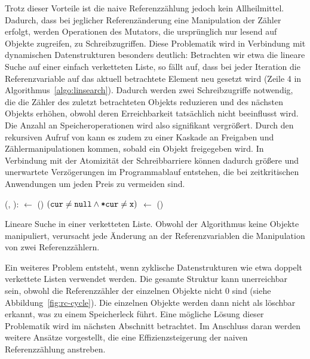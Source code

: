 Trotz dieser Vorteile ist die naive Referenzzählung jedoch kein Allheilmittel.
Dadurch, dass bei jeglicher Referenzänderung eine Manipulation der Zähler erfolgt, werden Operationen des Mutators, die ursprünglich nur lesend auf Objekte zugreifen, zu Schreibzugriffen.
Diese Problematik wird in Verbindung mit dynamischen Datenstrukturen besonders deutlich:
Betrachten wir etwa die lineare Suche auf einer einfach verketteten Liste, so fällt auf, dass bei jeder Iteration die Referenzvariable auf das aktuell betrachtete Element neu gesetzt wird (Zeile 4 in Algorithmus~\ref{algo:linsearch}).
Dadurch werden zwei Schreibzugriffe notwendig, die die Zähler des zuletzt betrachteten Objekts reduzieren und des nächsten Objekts erhöhen, obwohl deren Erreichbarkeit tatsächlich nicht beeinflusst wird.
Die Anzahl an Speicheroperationen wird also signifikant vergrößert.
Durch den rekursiven Aufruf von  kann es zudem zu einer Kaskade an Freigaben und Zählermanipulationen kommen, sobald ein Objekt freigegeben wird.
In Verbindung mit der Atomizität der Schreibbarriere können dadurch größere und unerwartete Verzögerungen im Programmablauf entstehen, die bei zeitkritischen Anwendungen um jeden Preis zu vermeiden sind.

\begin{algorithm}[h]
\begin{algorithmic}[1]
	\State {}(, ):
	\State \quad {} $\gets$ ()
	\State \quad \WHILE $(\texttt{cur} \neq \texttt{null} \wedge \texttt{*cur} \neq \texttt{x})$
	\State \quad \quad {} $\gets$ ()
	\State \quad \Return {} 
\end{algorithmic}
\caption[Lineare Suche]{Lineare Suche in einer verketteten Liste. Obwohl der Algorithmus keine Objekte manipuliert, verursacht jede Änderung an der Referenzvariablen  die Manipulation von zwei Referenzzählern.}
\label{algo:linsearch}
\end{algorithm}

Ein weiteres Problem entsteht, wenn zyklische Datenstrukturen wie etwa doppelt verkettete Listen verwendet werden.
Die gesamte Struktur kann unerreichbar sein, obwohl die Referenzzähler der einzelnen Objekte nicht $0$ sind (siehe Abbildung~\ref{fig:rc-cycle}).
Die einzelnen Objekte werden dann nicht als löschbar erkannt, was zu einem Speicherleck führt.
Eine mögliche Lösung dieser Problematik wird im nächsten Abschnitt betrachtet.
Im Anschluss daran werden weitere Ansätze vorgestellt, die eine Effizienzsteigerung der naiven Referenzzählung anstreben. 

